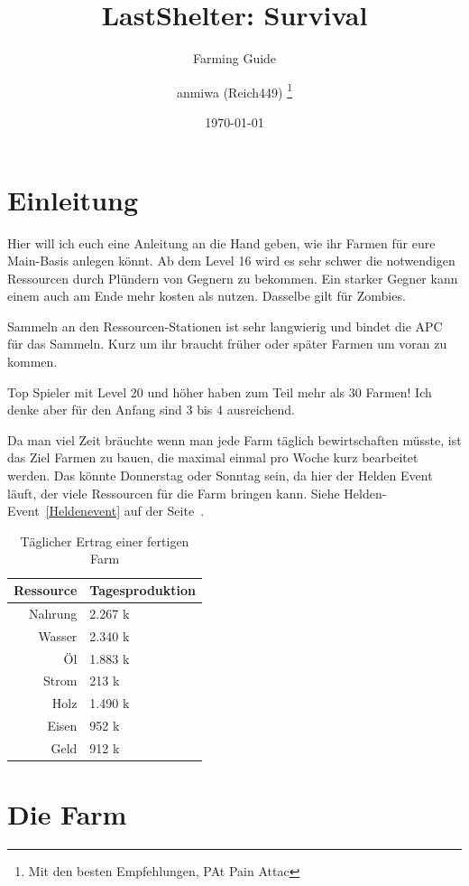 \documentclass[fontsize=12pt,a4paper]{scrartcl}[2003/01/01]
\title{LastShelter: Survival}
\subtitle{Farming Guide}
\author{\textcopyleft{} anmiwa (Reich449)%
  \thanks{Mit den besten Empfehlungen, PAt Pain Attac}}
\date{\today}               %
\begin{document}
\maketitle                  %
\tableofcontents            %
\listoffigures

\section{Einleitung}
Hier will ich euch eine Anleitung an die Hand geben, wie ihr Farmen für eure Main-Basis anlegen könnt.
Ab dem Level 16 wird es sehr schwer die notwendigen Ressourcen durch Plündern von Gegnern zu bekommen.
Ein starker Gegner kann einem auch am Ende mehr kosten als nutzen. Dasselbe gilt für Zombies.

Sammeln an den Ressourcen-Stationen ist sehr langwierig und bindet die APC für das Sammeln.
Kurz um ihr braucht früher oder später Farmen um voran zu kommen.

Top Spieler mit Level 20 und höher haben zum Teil mehr als 30 Farmen! Ich denke aber für den Anfang sind 3 bis 4 ausreichend.

Da man viel Zeit bräuchte wenn man jede Farm täglich bewirtschaften müsste, ist das Ziel Farmen zu bauen,
die maximal einmal pro Woche kurz bearbeitet werden. Das könnte Donnerstag oder Sonntag sein,
da hier der Helden Event läuft, der viele Ressourcen für die Farm bringen kann.
Siehe Helden-Event~\ref{Heldenevent} auf der Seite~\pageref{Heldenevent}.

\begin{table}[ht]
  \centering
    \begin{tabularx}{0.6\textwidth}{rl}
      Ressource & Tagesproduktion \\
      \hline
      Nahrung & 2.267 k \\
      Wasser & 2.340 k \\
      Öl & 1.883 k \\
      Strom & 213 k \\
      Holz & 1.490 k \\
      Eisen & 952 k \\
      Geld & 912 k \\
    \end{tabularx}
  \caption[Ertrag]{Täglicher Ertrag einer fertigen Farm}
\end{table}


\section{Die Farm}
\end{document}
